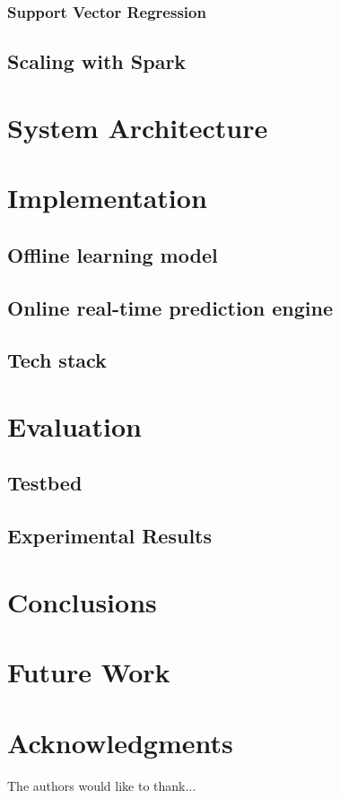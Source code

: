 \documentclass[conference]{IEEEtran}
\begin{document}
\subsubsection{Support Vector Regression}


\subsection{Scaling with Spark}


\section{System Architecture}


\section{Implementation}

\subsection{Offline learning model}

\subsection{Online real-time prediction engine}

\subsection{Tech stack}


\section{Evaluation}

\subsection{Testbed}

\subsection{Experimental Results}


\section{Conclusions}


\section{Future Work}


\section{Acknowledgments}
The authors would like to thank...




\end{document}
